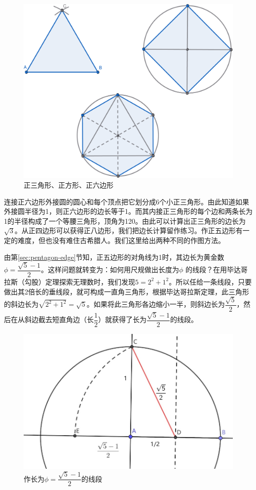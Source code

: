 \documentclass[b5paper]{ctexart}
\begin{document}
\begin{figure}[htbp]
 \centering
 \includegraphics[scale=0.35]{img/polygon}
 \caption{正三角形、正方形、正六边形}
 \label{fig:polygon}
\end{figure}

连接正六边形外接圆的圆心和每个顶点把它划分成6个小正三角形。由此知道如果外接圆半径为1，则正六边形的边长等于1。而其内接正三角形的每个边和两条长为1的半径构成了一个等腰三角形，顶角为120\degree。由此可以计算出正三角形的边长为$\sqrt{3}$。从正四边形可以获得正八边形，我们把边长计算留作练习。作正五边形有一定的难度，但也没有难住古希腊人。我们这里给出两种不同的作图方法。

由第\ref{sec:pentagon-edge}节知，正五边形的对角线为1时，其边长为黄金数$\phi = \dfrac{\sqrt{5}-1}{2}$。这样问题就转变为：如何用尺规做出长度为$\phi$ 的线段？在用毕达哥拉斯（勾股）定理探索无理数时，我们发现$5 = 2^2 + 1^2$。所以任给一条线段，只要做出其2倍长的垂线段，就可构成一直角三角形，根据毕达哥拉斯定理，此三角形的斜边长为$\sqrt{2^2 + 1^2} = \sqrt{5}$。如果将此三角形各边缩小一半，则斜边长为$\dfrac{\sqrt{5}}{2}$，然后在从斜边截去短直角边（长$\dfrac{1}{2}$）就获得了长为$\dfrac{\sqrt{5}-1}{2}$的线段。

\begin{figure}[htbp]
 \centering
 \includegraphics[scale=0.3]{img/phi}
 \caption{作长为$\phi = \dfrac{\sqrt{5} - 1}{2}$的线段}
 \label{fig:phi}
\end{figure}
\end{document}
